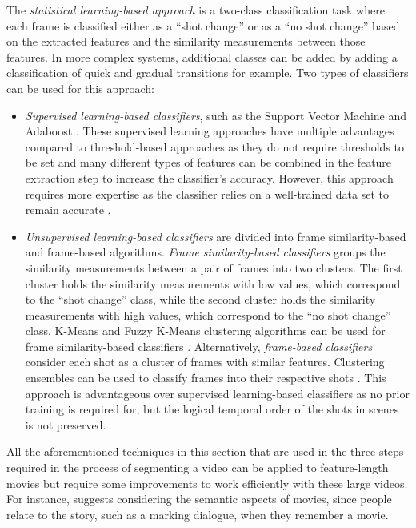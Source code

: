 The \textit{statistical learning-based approach} is a two-class classification task where each frame is classified either as a ``shot change'' or as a ``no shot change'' based on the extracted features and the similarity measurements between those features. In more complex systems, additional classes can be added by adding a classification of quick and gradual transitions for example. Two types of classifiers can be used for this approach:
\begin{itemize}
    \item \textit{Supervised learning-based classifiers}, such as the Support Vector Machine \cite{camara2007shot} and Adaboost \cite[p.617]{zhao2006shot}. These supervised learning approaches have multiple advantages compared to threshold-based approaches as they do not require thresholds to be set and many different types of features can be combined in the feature extraction step to increase the classifier's accuracy. However, this approach requires more expertise as the classifier relies on a well-trained data set to remain accurate \cite{hu2011survey}.
    
    \item \textit{Unsupervised learning-based classifiers} are divided into frame similarity-based and frame-based algorithms. \textit{Frame similarity-based classifiers} groups the similarity measurements between a pair of frames into two clusters. The first cluster holds the similarity measurements with low values, which correspond to the ``shot change'' class, while the second cluster holds the similarity measurements with high values, which correspond to the ``no shot change'' class. K-Means and Fuzzy K-Means clustering algorithms can be used for frame similarity-based classifiers \cite{lo2001fuzzykmeans}. Alternatively, \textit{frame-based classifiers} consider each shot as a cluster of frames with similar features. Clustering ensembles can be used to classify frames into their respective shots \cite{chang2007clusteringensemble}. This approach is advantageous over supervised learning-based classifiers as no prior training is required for, but the logical temporal order of the shots in scenes is not preserved.
\end{itemize}

All the aforementioned techniques in this section that are used in the three steps required in the process of segmenting a video can be applied to feature-length movies but require some improvements to work efficiently with these large videos. For instance, \cite{hanjalic1999moviesegmentation} suggests considering the semantic aspects of movies, since people relate to the story, such as a marking dialogue, when they remember a movie.

